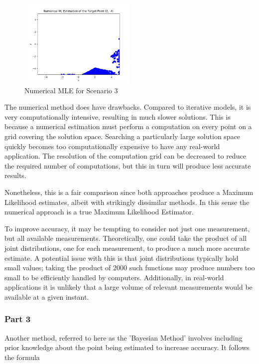 \documentclass[a4paper]{article}
\begin{document}
\begin{figure}[h]
	\begin{center}
		\includegraphics[width=0.5\textwidth]{numerical_mle.png}
		\caption{Numerical MLE for Scenario 3}
	\end{center}
\end{figure}

The numerical method does have drawbacks.  Compared to iterative models, it is very computationally intensive, resulting in much slower solutions.  This is because a numerical estimation must perform a computation on every point on a grid covering the solution space.  Searching a particularly large solution space quickly becomes too computationally expensive to have any real-world application.  The resolution of the computation grid can be decreased to reduce the required number of computations, but this in turn will produce less accurate results.

Nonetheless, this is a fair comparison since both approaches produce a Maximum Likelihood estimates, albeit with strikingly dissimilar methods.  In this sense the numerical approach is a true Maximum Likelihood Estimator.

To improve accuracy, it may be tempting to consider not just one measurement, but all available measurements.  Theoretically, one could take the product of all joint distributions, one for each measurement, to produce a much more accurate estimate.  A potential issue with this is that joint distributions typically hold small values; taking the product of 2000 such functions may produce numbers too small to be efficiently handled by computers.  Additionally, in real-world applications it is unlikely that a large volume of relevant measurements would be available at a given instant.

\subsubsection*{Part 3}

Another method, referred to here as the 'Bayesian Method' involves including prior knowledge about the point being estimated to increase accuracy.  It follows the formula
\end{document}
